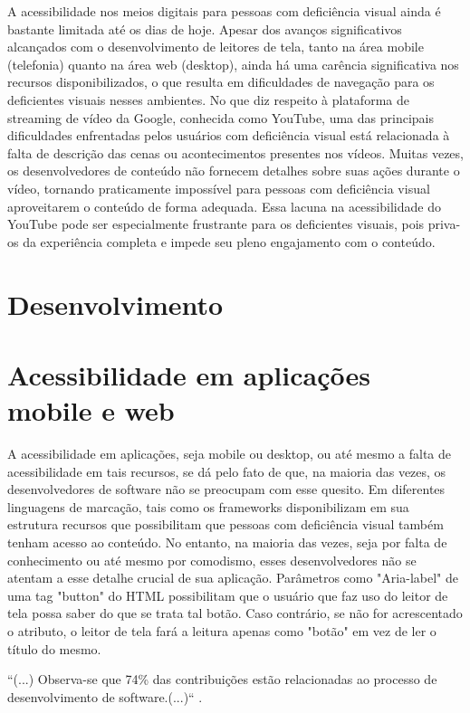 \documentclass[12pt]{article}
\begin{document}
A acessibilidade nos meios digitais para pessoas com deficiência visual ainda é bastante limitada até os dias de hoje. Apesar dos avanços significativos alcançados com o desenvolvimento de leitores de tela, tanto na área mobile (telefonia) quanto na área web (desktop), ainda há uma carência significativa nos recursos disponibilizados, o que resulta em dificuldades de navegação para os deficientes visuais nesses ambientes.
No que diz respeito à plataforma de streaming de vídeo da Google, conhecida como YouTube, uma das principais dificuldades enfrentadas pelos usuários com deficiência visual está relacionada à falta de descrição das cenas ou acontecimentos presentes nos vídeos. Muitas vezes, os desenvolvedores de conteúdo não fornecem detalhes sobre suas ações durante o vídeo, tornando praticamente impossível para pessoas com deficiência visual aproveitarem o conteúdo de forma adequada.
Essa lacuna na acessibilidade do YouTube pode ser especialmente frustrante para os deficientes visuais, pois priva-os da experiência completa e impede seu pleno engajamento com o conteúdo. 
 
\section{Desenvolvimento}

\section{Acessibilidade em aplicações mobile e web}

A acessibilidade em aplicações, seja mobile ou desktop, ou até mesmo a falta de acessibilidade em tais recursos, se dá pelo fato de que, na maioria das vezes, os desenvolvedores de software não se preocupam com esse quesito. Em diferentes linguagens de marcação, tais como os frameworks disponibilizam em sua estrutura recursos que possibilitam que pessoas com deficiência visual também tenham acesso ao conteúdo. No entanto, na maioria das vezes, seja por falta de conhecimento ou até mesmo por comodismo, esses desenvolvedores não se atentam a esse detalhe crucial de sua aplicação. Parâmetros como "Aria-label" de uma tag "button" do HTML possibilitam que o usuário que faz uso do leitor de tela possa saber do que se trata tal botão. Caso contrário, se não for acrescentado o atributo, o leitor de tela fará a leitura apenas como "botão" em vez de ler o título do mesmo. 

``(...) Observa-se que 74\% das contribuições estão relacionadas ao processo de desenvolvimento de software.(...)`` \cite{semish2016}.
\end{document}
